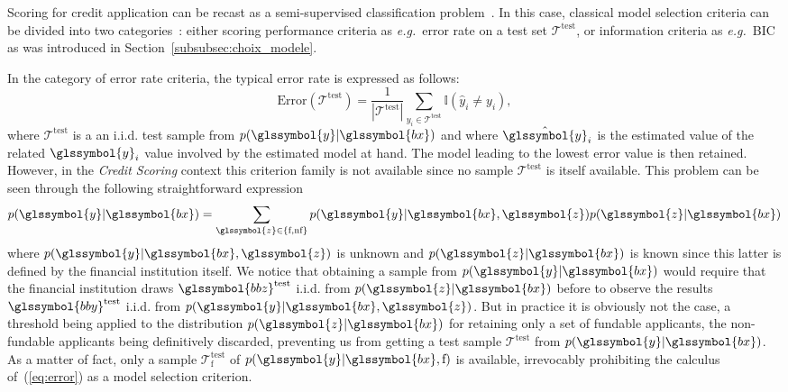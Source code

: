 Scoring for credit application can be recast as a semi-supervised classification problem~\cite{Chapelle:2010:SL:1841234}. In this case, classical model selection criteria can be divided into two categories~\cite{vandewalle:tel-00447141}: either scoring performance criteria as \textit{e.g.}\ error rate on a test set $\mathcal{T}^{\text{test}}$, or information criteria as \textit{e.g.}\ BIC as was introduced in Section~\ref{subsubsec:choix_modele}.

In the category of error rate criteria, the typical error rate is expressed as follows:
\begin{equation}
\mbox{Error}(\mathcal{T}^\text{test}) = \frac{1}{|\mathcal{T}^\text{test}|} \sum_{y_i \in \mathcal{T}^\text{test}} \mathbb{I}(\hat y_i \neq y_i),
\end{equation} 
where $\mathcal{T}^\text{test}$ is a an i.i.d. test sample from $p(\glssymbol{y}|\glssymbol{bx})$ and where $\hat{\glssymbol{y}}_i$ is the estimated value of the related $\glssymbol{y}_i$ value involved by the estimated model at hand. The model leading to the lowest error value is then retained. However, in the \textit{Credit Scoring} context this criterion family is not available since no sample $\mathcal{T}^\text{test}$ is itself available. This problem can be seen through the following straightforward expression
\begin{equation}\label{eq:error}
p(\glssymbol{y}|\glssymbol{bx}) = \sum_{\glssymbol{z}\in\{\text{f},\text{nf}\}} p(\glssymbol{y}|\glssymbol{bx},\glssymbol{z}) p(\glssymbol{z}|\glssymbol{bx})
\end{equation}
where $p(\glssymbol{y}|\glssymbol{bx},\glssymbol{z})$ is unknown and $p(\glssymbol{z}|\glssymbol{bx})$ is known since this latter is defined by the financial institution itself. We notice that obtaining a sample from $p(\glssymbol{y}|\glssymbol{bx})$ would require that the financial institution draws $\glssymbol{bbz}^\text{test}$ i.i.d. from $p(\glssymbol{z}|\glssymbol{bx})$ before to observe the results $\glssymbol{bby}^\text{test}$ i.i.d. from $p(\glssymbol{y}|\glssymbol{bx},\glssymbol{z})$. But in practice it is obviously not the case, a threshold being applied to the distribution $p(\glssymbol{z}|\glssymbol{bx})$ for retaining only a set of fundable applicants, the non-fundable applicants being definitively discarded, preventing us from getting a test sample $\mathcal{T}^\text{test}$ from $p(\glssymbol{y} | \glssymbol{bx})$. As a matter of fact, only a sample $\mathcal{T}^\text{test}_{\text{f}}$ of $p(\glssymbol{y}|\glssymbol{bx},\text{f})$ is available, 
irrevocably prohibiting the calculus of~(\ref{eq:error}) as a model selection criterion.

